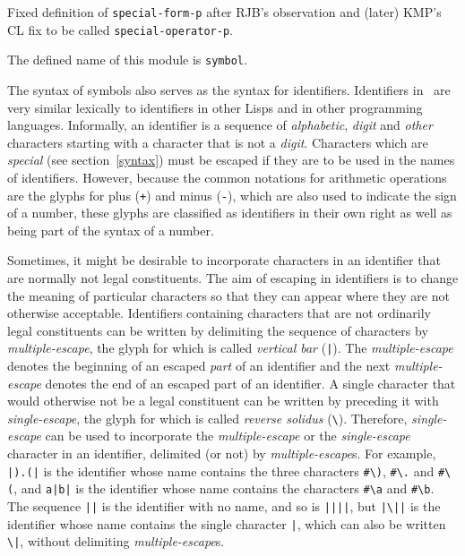 \label{symbol}
%
\begin{optPrivate}
    Fixed definition of {\tt special-form-p} after RJB's observation and (later)
    KMP's CL fix to be called {\tt special-operator-p}.
\end{optPrivate}
%
\begin{optDefinition}
The defined name of this module is {\tt symbol}.

%
The syntax of symbols also serves as the syntax for identifiers.
Identifiers in \eulisp\ are very similar lexically
to identifiers in other Lisps and in other programming languages.
Informally, an identifier is a
sequence of {\em alphabetic}, {\em digit\/} and {\em other\/}
characters starting with a character that is not a {\em digit}.
Characters which are {\em special\/} (see section~\ref{syntax}) must
be escaped if they are to be used in the names of identifiers.
However, because the common notations for arithmetic operations are
the glyphs for plus (\verb-+-) and minus (\verb+-+), which are also
used to indicate the sign of a number, these glyphs are classified as
identifiers in their own
right as well as being part of the syntax of a number.

Sometimes, it might be desirable to incorporate characters in an
identifier that are normally not legal constituents.  The aim of
escaping in identifiers is to change the meaning of particular
characters so that they can appear where they are not otherwise
acceptable.  Identifiers containing characters that are not ordinarily
legal constituents can be written by delimiting the sequence of
characters by {\em multiple-escape}, the glyph for which is called
{\em vertical bar\/} (\verb+|+).  The {\em multiple-escape\/} denotes
the beginning of an escaped {\em part\/} of an identifier and the next
{\em multiple-escape\/} denotes the end of an escaped part of an
identifier.  A single character that would otherwise not be a legal
constituent can be written by preceding it with {\em single-escape},
the glyph for which is called {\em reverse solidus\/} (\verb+\+).
Therefore, {\em single-escape\/} can be used to incorporate the {\em
multiple-escape\/} or the {\em single-escape\/} character in an
identifier, delimited (or not) by {\em multiple-escape\/}s.  For
example, \verb+|).(|+ is the identifier whose name contains the three
characters \verb+#\)+, \verb+#\.+ and \verb+#\(+, and \verb+a|b|+ is
the identifier whose name contains the characters \verb+#\a+ and
\verb+#\b+.  The sequence \verb+||+ is the identifier with no name,
and so is \verb+||||+, but \verb+|\||+ is the identifier whose name
contains the single character \verb+|+, which can also be written
\verb+\|+, without delimiting {\em multiple-escape\/}s.


\end{optDefinition}
